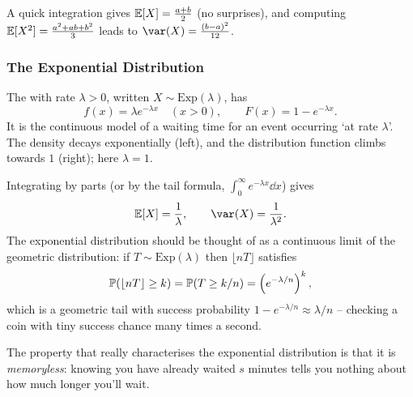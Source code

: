 \documentclass[a4paper]{scrartcl}
\begin{document}
A quick integration gives $\mathbb{E}[X] = \frac{a + b}{2}$ (no surprises), and computing $\mathbb{E}[X^2] = \frac{a^2 + ab + b^2}{3}$ leads to $\var(X) = \frac{(b-a)^2}{12}$.

\subsubsection*{The Exponential Distribution}

The  with rate $\lambda > 0$, written $X \sim \mathrm{Exp}(\lambda)$, has
$$
f(x) = \lambda e^{-\lambda x} \quad (x > 0), \qquad F(x) = 1 - e^{-\lambda x}.
$$
It is the continuous model of a waiting time for an event occurring `at rate $\lambda$'. The density decays exponentially (left), and the distribution function climbs towards $1$ (right); here $\lambda = 1$.

\begin{center}
\qquad
{}
\end{center}

Integrating by parts (or by the tail formula, $\int_0^\infty e^{-\lambda x}\dd x$) gives
$$
\EE[X] = \frac{1}{\lambda}, \qquad \var(X) = \frac{1}{\lambda^2}.
$$
The exponential distribution should be thought of as a continuous limit of the geometric distribution: if $T \sim \mathrm{Exp}(\lambda)$ then $\lfloor nT \rfloor$ satisfies
$$
\mathbb{P}(\lfloor nT \rfloor \geq k) = \mathbb{P}(T \geq k/n) = \left(e^{-\lambda/n}\right)^k,
$$
which is a geometric tail with success probability $1 - e^{-\lambda/n} \approx \lambda/n$ -- checking a coin with tiny success chance many times a second.

The property that really characterises the exponential distribution is that it is \emph{memoryless}: knowing you have already waited $s$ minutes tells you nothing about how much longer you'll wait.
\end{document}
